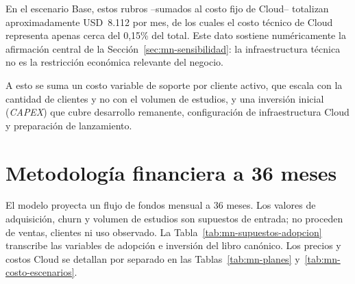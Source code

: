 En el escenario Base, estos rubros --sumados al costo fijo de Cloud-- totalizan aproximadamente USD~8.112 por mes, de los cuales el costo técnico de Cloud representa apenas cerca del 0,15\% del total. Este dato sostiene numéricamente la afirmación central de la Sección~\ref{sec:mn-sensibilidad}: la infraestructura técnica no es la restricción económica relevante del negocio.

A esto se suma un costo variable de soporte por cliente activo, que escala con la cantidad de clientes y no con el volumen de estudios, y una inversión inicial (\textit{CAPEX}) que cubre desarrollo remanente, configuración de infraestructura Cloud y preparación de lanzamiento.

\section{Metodología financiera a 36 meses}
\label{sec:mn-metodologia}

El modelo proyecta un flujo de fondos mensual a 36 meses. Los valores de adquisición, churn y volumen de estudios son supuestos de entrada; no proceden de ventas, clientes ni uso observado. La Tabla~\ref{tab:mn-supuestos-adopcion} transcribe las variables de adopción e inversión del libro canónico. Los precios y costos Cloud se detallan por separado en las Tablas~\ref{tab:mn-planes} y~\ref{tab:mn-costo-escenarios}.

